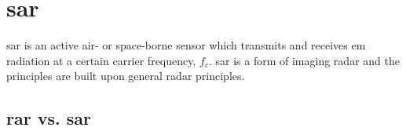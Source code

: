 \section{\acf{sar}} \label{sec:theory.sar}

\acs{sar} is an active air- or space-borne sensor which transmits and receives \acs{em} radiation at a certain carrier frequency, $f_c$. \acs{sar} is a form of imaging radar and the principles are built upon general radar principles. 



\subsection{\acs{rar} vs. \acs{sar}} \label{subsec:theory.RARvSAR}

